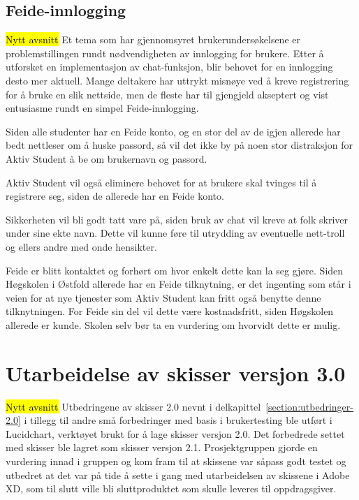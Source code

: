 \subsection{Feide-innlogging}
\label{section:feide}
\hl{Nytt avsnitt}
Et tema som har gjennomsyret brukerundersøkelsene er problemstillingen rundt nødvendigheten av innlogging for brukere. Etter å utforsket en implementasjon av chat-funksjon, blir behovet for en innlogging desto mer aktuell. Mange deltakere har uttrykt misnøye ved å kreve registrering for å bruke en slik nettside, men de fleste har til gjengjeld akseptert og vist entusiasme rundt en simpel Feide-innlogging.

Siden alle studenter har en Feide konto, og en stor del av de igjen allerede har bedt nettleser om å huske passord, så vil det ikke by på noen stor distraksjon for Aktiv Student å be om brukernavn og passord.

Aktiv Student vil også eliminere behovet for at brukere skal tvinges til å registrere seg, siden de allerede har en Feide konto.

Sikkerheten vil bli godt tatt vare på, siden bruk av chat vil kreve at folk skriver under sine ekte navn. Dette vil kunne føre til utrydding av eventuelle nett-troll og ellers andre med onde hensikter.

Feide er blitt kontaktet og forhørt om hvor enkelt dette kan la seg gjøre. Siden Høgskolen i Østfold allerede har en Feide tilknytning, er det ingenting som står i veien for at nye tjenester som Aktiv Student kan fritt også benytte denne tilknytningen. For Feide sin del vil dette være kostnadsfritt, siden Høgskolen allerede er kunde. Skolen selv bør ta en vurdering om hvorvidt dette er mulig.


\section{Utarbeidelse av skisser versjon 3.0}
\hl{Nytt avsnitt}
Utbedringene av skisser 2.0 nevnt i delkapittel~\ref{section:utbedringer-2.0} i tillegg til andre små forbedringer med basis i brukertesting ble utført i Lucidchart, verktøyet brukt for å lage skisser versjon 2.0. Det forbedrede settet med skisser ble lagret som skisser versjon 2.1. Prosjektgruppen gjorde en vurdering innad i gruppen og kom fram til at skissene var såpass godt testet og utbedret at det var på tide å sette i gang med utarbeidelsen av skissene i Adobe XD, som til slutt ville bli sluttproduktet som skulle leveres til oppdragsgiver.

